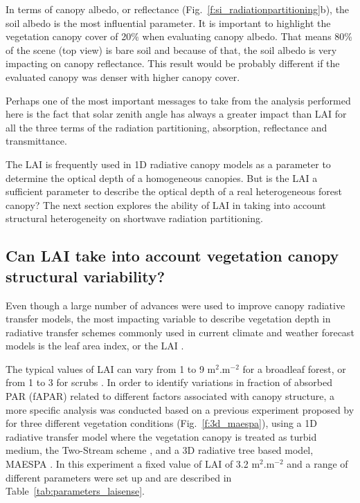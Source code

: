 \documentclass[a4paper,11pt]{report}
\begin{document}
In terms of canopy albedo, or reflectance (Fig.~\ref{f:si_radiationpartitioning}b), the soil albedo is the most influential parameter. It is important to highlight the vegetation canopy cover of 20\% when evaluating canopy albedo. That means 80\% of the scene (top view) is bare soil and because of that, the soil albedo is very impacting on canopy reflectance. This result would be probably different if the evaluated canopy was denser with higher canopy cover.

Perhaps one of the most important messages to take from the analysis performed here is the fact that solar zenith angle has always a greater impact than LAI for all the three terms of the radiation partitioning, absorption, reflectance and transmittance. 

The LAI is frequently used in 1D radiative canopy models as a parameter to determine the optical depth of a homogeneous canopies. But is the LAI a sufficient parameter to describe the optical depth of a real heterogeneous forest canopy? The next section explores the ability of LAI in taking into account structural heterogeneity on shortwave radiation partitioning. 

\subsection{Can LAI take into account vegetation canopy structural variability?}\label{section:lai}
Even though a large number of advances were used to improve canopy radiative transfer models, the most impacting variable to describe vegetation depth in radiative transfer schemes commonly used in current climate and weather forecast models is the leaf area index, or the LAI \citep{Yang2001}.

The typical values of LAI can vary from 1 to 9 m$^2$.m$^{-2}$ for a broadleaf forest, or from 1 to 3 for scrubs \citep{Clark2011}. In order to identify variations in fraction of absorbed PAR (fAPAR) related to different factors associated with canopy structure, a more specific analysis was conducted based on a previous experiment proposed by \citet{pinty2006} for three different vegetation conditions (Fig.~\ref{f:3d_maespa}), using a 1D radiative transfer model where the vegetation canopy is treated as turbid medium, the Two-Stream scheme \citep{Sellers1985}, and a 3D radiative tree based model, MAESPA \citep{Duursma2012}. In this experiment a fixed value of LAI of 3.2 m$^2$.m$^{-2}$ and a range of different parameters were set up and are described in Table~\ref{tab:parameters_laisense}.
\end{document}
